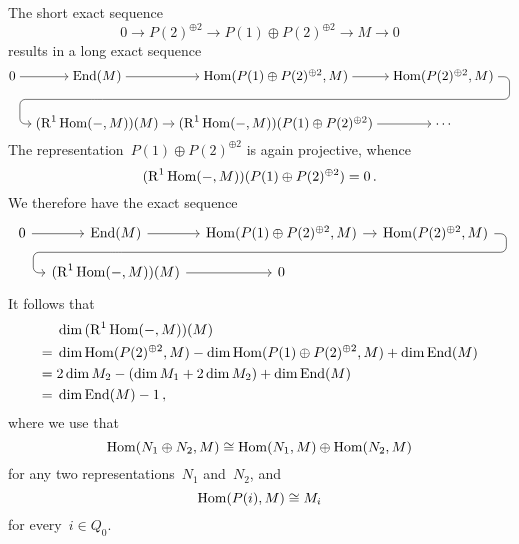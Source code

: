 The short exact sequence
\[
  0
  \to
  P(2)^{\oplus 2}
  \to
  P(1) \oplus P(2)^{\oplus 2}
  \to
  M
  \to
  0
\]
results in a long exact sequence
\[
  \begin{tikzcd}[column sep = 0.9em, cramped]
      0
      \arrow{r}
    & \End(M)
      \arrow{r}
      \arrow[d, phantom, ""{coordinate, name=Z}]
    & \Hom(P(1) \oplus P(2)^{\oplus 2}, M)
      \arrow{r}
    & \Hom(P(2)^{\oplus 2}, M)
      \arrow[ dll,
              rounded corners,
              to path={ -- ([xshift=2ex]\tikztostart.east)
                        |- (Z) \tikztonodes
                        -| ([xshift=-2ex]\tikztotarget.west)
                        -- (\tikztotarget)}
            ]
    \\
      {}
    & (\Right^1 \Hom(-,M))(M)
      \arrow{r}
    & (\Right^1 \Hom(-,M))(P(1) \oplus P(2)^{\oplus 2})
      \arrow{r}
    & \cdots
  \end{tikzcd}
\]
The representation~$P(1) \oplus P(2)^{\oplus 2}$ is again projective, whence
\[
  (\operatorname{R}^1 \operatorname{Hom}(-,M))(P(1) \oplus P(2)^{\oplus 2})
  =
  0 \,.
\]
We therefore have the exact sequence
\[
  \begin{tikzcd}[column sep = 1em, row sep = small]
      0
      \arrow{r}
    & \End(M)
      \arrow{r}
      \arrow[d, phantom, ""{coordinate, name=Z1}]
    & \Hom(P(1) \oplus P(2)^{\oplus 2}, M)
      \arrow{r}
    & \Hom(P(2)^{\oplus 2}, M)
      \arrow[ dll,
              rounded corners,
              to path={ -- ([xshift=2ex]\tikztostart.east)
                        |- (Z1) \tikztonodes
                        -| ([xshift=-2ex]\tikztotarget.west)
                        -- (\tikztotarget)}
            ]
    \\
      {}
    & (\Right^1 \Hom(-,M))(M)
      \arrow{r}
    & 0
    & {}
  \end{tikzcd}
\]
It follows that
\begin{align*}
  {}&
  \dim {(\operatorname{R}^1 \operatorname{Hom}(-,M))(M)}
  \\
  ={}&
  \dim \operatorname{Hom}(P(2)^{\oplus 2}, M)
  -
  \dim \operatorname{Hom}(P(1) \oplus P(2)^{\oplus 2}, M)
  +
  \dim
  \operatorname{End}(M)
  \\
  ={}&
  2 \dim M_2
  -
  (\dim M_1 + 2 \dim M_2)
  +
  \dim \operatorname{End}(M)
  \\
  ={}&
  \dim \operatorname{End}(M) - 1 \,,
\end{align*}
where we use that
\[
  \operatorname{Hom}(N_1 \oplus N_2, M)
  \cong
  \operatorname{Hom}(N_1, M) \oplus \operatorname{Hom}(N_2, M)
\]
for any two representations~$N_1$ and~$N_2$, and
\[
  \operatorname{Hom}(P(i), M)
  \cong
  M_i
\]
for every~$i \in Q_0$.



